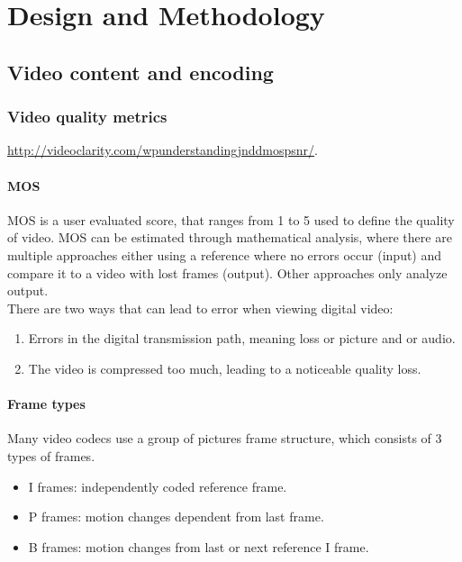 \chapter{Design and Methodology}
\label{cha:design-and-method}

\section{Video content and encoding}
\label{sec:video-encoding}

\subsection{Video quality metrics}
\url{http://videoclarity.com/wpunderstandingjnddmospsnr/}. 

\subsubsection{\ac{MOS}}
MOS is a user evaluated score, that ranges from 1 to 5 used to define the quality of video. MOS can be estimated through mathematical analysis, where there are multiple approaches either using a reference where no errors occur (input) and compare it to a video with lost frames (output). Other approaches only analyze output.\\
There are two ways that can lead to error when viewing digital video:
\begin{enumerate}
    \item Errors in the digital transmission path, meaning loss or picture and or audio.
    \item The video is compressed too much, leading to a noticeable quality loss.
\end{enumerate}

\subsubsection{Frame types}
Many video codecs use a group of pictures frame structure, which consists of 3 types of frames.

\begin{itemize}
    \item I frames: independently coded reference frame.
    \item P frames: motion changes dependent from last frame.
    \item B frames: motion changes from last or next reference I frame.
\end{itemize}

